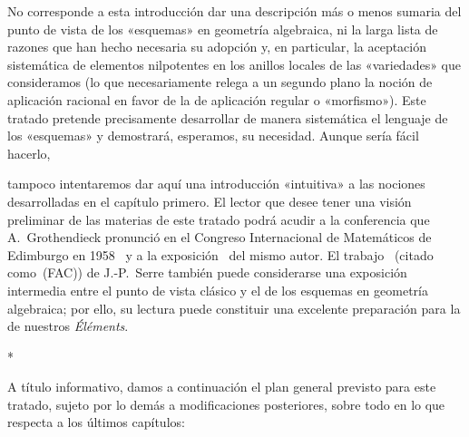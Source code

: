 No corresponde a esta introducción dar una descripción más o menos sumaria del punto de vista de los «esquemas» en geometría algebraica, ni la larga lista de razones que han hecho necesaria su adopción y, en particular, la aceptación sistemática de elementos nilpotentes en los anillos locales de las «variedades» que consideramos (lo que necesariamente relega a un segundo plano la noción de aplicación racional en favor de la de aplicación regular o «morfismo»).
Este tratado pretende precisamente desarrollar de manera sistemática el lenguaje de los «esquemas» y demostrará, esperamos, su necesidad.
Aunque sería fácil hacerlo,

tampoco intentaremos dar aquí una introducción «intuitiva» a las nociones desarrolladas en el capítulo primero.
El lector que desee tener una visión preliminar de las materias de este tratado podrá acudir a la conferencia que A.~Grothendieck pronunció en el Congreso Internacional de Matemáticos de Edimburgo en 1958~\cite{I-7} y a la exposición~\cite{I-8} del mismo autor.
El trabajo~\cite{I-14} (citado como~(FAC)) de J.-P.~Serre también puede considerarse una exposición intermedia entre el punto de vista clásico y el de los esquemas en geometría algebraica; por ello, su lectura puede constituir una excelente preparación para la de nuestros \emph{Éléments}.

\bigskip
\begin{center}*\quad*\quad*\end{center}
\bigskip

A título informativo, damos a continuación el plan general previsto para este tratado, sujeto por lo demás a modificaciones posteriores, sobre todo en lo que respecta a los últimos capítulos:

